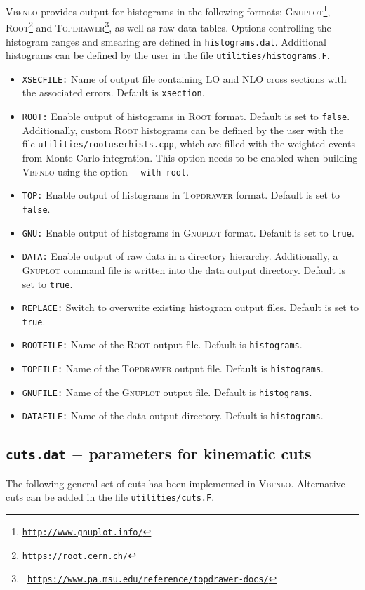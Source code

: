 \documentclass[english,12pt]{article}
\begin{document}
\textsc{Vbfnlo} provides output for histograms in the following formats:
\textsc{Gnuplot}\footnote{\tt \url{http://www.gnuplot.info/}},
\textsc{Root}\footnote{\tt \url{https://root.cern.ch/}} and \textsc{Topdrawer}\footnote{\tt
\url{https://www.pa.msu.edu/reference/topdrawer-docs/}}, 
as well as raw data tables.  Options controlling the histogram ranges and smearing are defined in
{\tt histograms.dat}. Additional histograms can be defined by the user in the
file {\tt utilities/histograms.F}.
\begin{itemize}
\item {\tt XSECFILE:} Name of output file containing LO and NLO cross sections
with the associated errors.  Default is {\tt xsection}.
\item {\tt ROOT:} Enable output of histograms in \textsc{Root} format. Default
is set to {\tt false}. Additionally, custom \textsc{Root}
histograms can be defined by the user with the file {\tt utilities/rootuserhists.cpp}, which are filled with the
weighted events from Monte Carlo integration.  This option needs to be enabled
when building \textsc{Vbfnlo} using the option {\tt -{}-with-root}.
\item {\tt TOP:} Enable output of histograms  in 
  \textsc{Topdrawer} format. Default is set to {\tt false}.
\item {\tt GNU:} Enable output of histograms in \textsc{Gnuplot}
  format. Default is set to {\tt true}.
\item {\tt DATA:} Enable output of raw data in a directory hierarchy. Additionally, a \textsc{Gnuplot}
                  command file is written into the data output directory.
  Default is set to {\tt true}.
\item {\tt REPLACE:} Switch to overwrite existing histogram output files. 
Default is set to {\tt true}. 
\item {\tt ROOTFILE:} Name of the \textsc{Root} output file. Default is 
{\tt histograms}.
\item {\tt TOPFILE:}  Name of the \textsc{Topdrawer} output file. Default is 
{\tt histograms}.
\item {\tt GNUFILE:}  Name of the \textsc{Gnuplot} output file. Default is 
{\tt histograms}.
\item {\tt DATAFILE:}  Name of the data output directory. Default is 
{\tt histograms}.
\end{itemize}



\subsection{{\tt cuts.dat} $-$ parameters for kinematic cuts}
\label{sec:cuts}
%
The following general set of cuts has been implemented in \textsc{Vbfnlo}.  Alternative cuts can be added in the file {\tt utilities/cuts.F}. 
\end{document}
